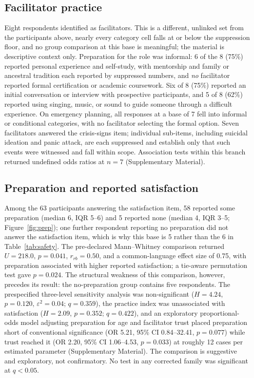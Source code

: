 \documentclass[12pt]{article}
\begin{document}
\subsection{Facilitator practice}

Eight respondents identified as facilitators. This is a different, unlinked set from the participants
above, nearly every category cell falls at or below the suppression floor, and no group comparison at this
base is meaningful; the material is descriptive context only. Preparation for the role was informal: 6 of
the 8 (75\%) reported personal experience and self-study, with mentorship and family or ancestral tradition
each reported by suppressed numbers, and \emph{no} facilitator reported formal certification or academic
coursework. Six of 8 (75\%) reported an initial conversation or interview with prospective participants,
and 5 of 8 (62\%) reported using singing, music, or sound to guide someone through a difficult experience.
On emergency planning, all responses at a base of 7 fell into informal or conditional categories, with no
facilitator selecting the formal option. Seven facilitators answered the crisis-signs item; individual
sub-items, including suicidal ideation and panic attack, are each suppressed and establish only that such
events were witnessed and fall within scope. Association tests within this branch returned undefined odds
ratios at $n=7$ (Supplementary Material).

\subsection{Preparation and reported satisfaction}

Among the 63 participants answering the satisfaction item, 58 reported some preparation (median 6, IQR
5--6) and 5 reported none (median 4, IQR 3--5; Figure~\ref{fig:prep}); one further respondent reporting no
preparation did not answer the satisfaction item, which is why this base is 5 rather than the 6 in
Table~\ref{tab:safety}. The pre-declared Mann--Whitney
comparison returned $U=218.0$, $p=0.041$, $r_{rb}=0.50$, and a common-language effect size of 0.75, with
preparation associated with higher reported satisfaction; a tie-aware permutation test gave $p=0.024$. The
structural weakness of this comparison, however, precedes its result: the no-preparation group contains
five respondents. The prespecified three-level sensitivity analysis was non-significant ($H=4.24$,
$p=0.120$, $\varepsilon^2=0.04$; $q=0.359$), the practice index was unassociated with satisfaction
($H=2.09$, $p=0.352$; $q=0.422$), and an exploratory proportional-odds model adjusting preparation for age
and facilitator trust placed preparation short of conventional significance (OR 5.21, 95\% CI 0.84--32.41,
$p=0.077$) while trust reached it (OR 2.20, 95\% CI 1.06--4.53, $p=0.033$) at roughly 12 cases per
estimated parameter (Supplementary Material). The comparison is suggestive and exploratory, not
confirmatory. No test in any corrected family was significant at $q<0.05$.
\end{document}

